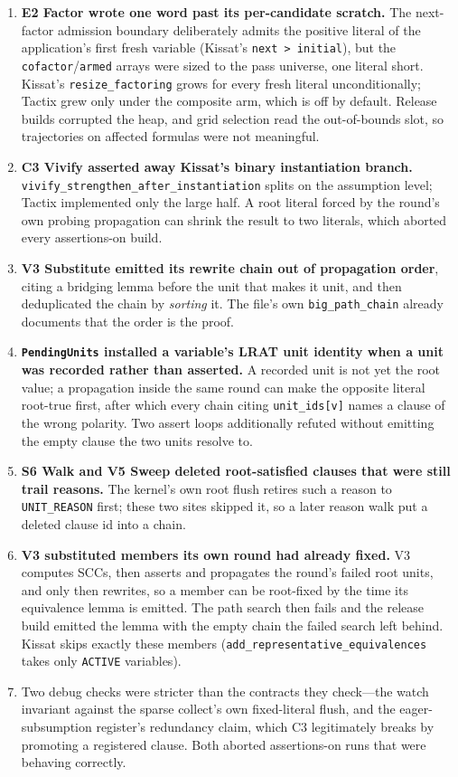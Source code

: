 \documentclass[11pt]{article}
\newcommand{\code}[1]{\texttt{#1}}
\begin{document}
\begin{enumerate}
\item \textbf{E2 Factor wrote one word past its per-candidate scratch.}  The
next-factor admission boundary deliberately admits the positive literal of the
application's first fresh variable (Kissat's \code{next > initial}), but the
\code{cofactor}/\code{armed} arrays were sized to the pass universe, one literal
short.  Kissat's \code{resize\_factoring} grows for every fresh literal
unconditionally; Tactix grew only under the composite arm, which is off by
default.  Release builds corrupted the heap, and grid selection read the
out-of-bounds slot, so trajectories on affected formulas were not meaningful.
\item \textbf{C3 Vivify asserted away Kissat's binary instantiation branch.}
\code{vivify\_strengthen\_after\_instantiation} splits on the assumption level;
Tactix implemented only the large half.  A root literal forced by the round's
own probing propagation can shrink the result to two literals, which aborted
every assertions-on build.
\item \textbf{V3 Substitute emitted its rewrite chain out of propagation
order}, citing a bridging lemma before the unit that makes it unit, and then
deduplicated the chain by \emph{sorting} it.  The file's own
\code{big\_path\_chain} already documents that the order is the proof.
\item \textbf{\code{PendingUnits} installed a variable's LRAT unit identity when
a unit was recorded rather than asserted.}  A recorded unit is not yet the root
value; a propagation inside the same round can make the opposite literal
root-true first, after which every chain citing \code{unit\_ids[v]} names a
clause of the wrong polarity.  Two assert loops additionally refuted without
emitting the empty clause the two units resolve to.
\item \textbf{S6 Walk and V5 Sweep deleted root-satisfied clauses that were
still trail reasons.}  The kernel's own root flush retires such a reason to
\code{UNIT\_REASON} first; these two sites skipped it, so a later reason walk
put a deleted clause id into a chain.
\item \textbf{V3 substituted members its own round had already fixed.}  V3
computes SCCs, then asserts and propagates the round's failed root units, and
only then rewrites, so a member can be root-fixed by the time its equivalence
lemma is emitted.  The path search then fails and the release build emitted the
lemma with the empty chain the failed search left behind.  Kissat skips exactly
these members (\code{add\_representative\_equivalences} takes only
\code{ACTIVE} variables).
\item[7--8.] Two debug checks were stricter than the contracts they check---the
watch invariant against the sparse collect's own fixed-literal flush, and the
eager-subsumption register's redundancy claim, which C3 legitimately breaks by
promoting a registered clause.  Both aborted assertions-on runs that were
behaving correctly.
\end{enumerate}
\end{document}
